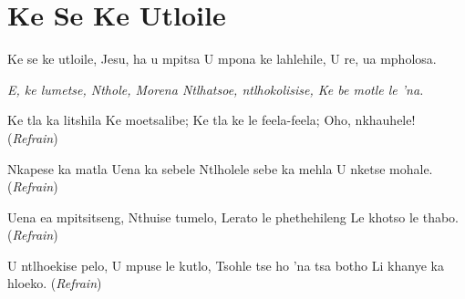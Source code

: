\starttocol
\chapter{Ke Se Ke Utloile}
\nexttocol
\hfill{\it }
\stoptocol
\starttocol
\startlines
{\sc Ke} se ke utloile,
Jesu, ha u mpitsa
U mpona ke lahlehile,
U re, ua mpholosa.

{\it E, ke lumetse,
Nthole, Morena
Ntlhatsoe, ntlhokolisise,
Ke be motle le 'na.}

Ke tla ka litshila
Ke moetsalibe;
Ke tla ke le feela-feela;
Oho, nkhauhele!          \hfill({\it Refrain})~~~~~~~~~

Nkapese ka matla
Uena ka sebele
Ntlholele sebe ka mehla
U nketse mohale.          \hfill({\it Refrain})~~~~~~~~~

Uena ea mpitsitseng,
Nthuise tumelo,
Lerato le phethehileng
Le khotso le thabo.	          \hfill({\it Refrain})~~~~~~~~~

U ntlhoekise pelo,
U mpuse le kutlo,
Tsohle tse ho 'na tsa botho
Li khanye ka hloeko.         \hfill({\it Refrain})~~~~~~~~~
\stoplines
\nexttocol

\stoptocol
